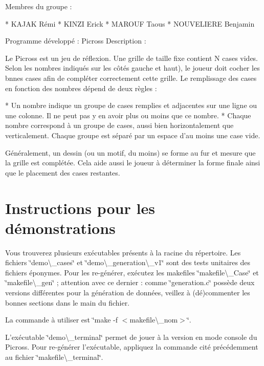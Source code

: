Membres du groupe \+: \begin{DoxyVerb}* KAJAK Rémi
* KINZI Erick
* MAROUF Taous
* NOUVELIERE Benjamin
\end{DoxyVerb}


Programme développé \+: Picross Description \+:

Le Picross est un jeu de réflexion. Une grille de taille fixe contient N cases vides. Selon les nombres indiqués sur les côtés gauche et haut), le joueur doit cocher les bnnes cases afin de compléter correctement cette grille. Le remplissage des cases en fonction des nombres dépend de deux règles \+: \begin{DoxyVerb}* Un nombre indique un groupe de cases remplies et adjacentes sur une ligne ou une colonne. Il ne peut pas y en avoir plus ou moins que ce nombre.
* Chaque nombre correspond à un groupe de cases, aussi bien horizontalement que verticalement. Chaque groupe est séparé par un espace d'au moins une case vide.
\end{DoxyVerb}


Généralement, un dessin (ou un motif, du moins) se forme au fur et mesure que la grille est complétée. Cela aide aussi le joueur à déterminer la forme finale ainsi que le placement des cases restantes.

\section*{Instructions pour les démonstrations}

Vous trouverez plusieurs exécutables présents à la racine du répertoire. Les fichiers \char`\"{}demo\textbackslash{}\+\_\+cases\char`\"{} et \char`\"{}demo\textbackslash{}\+\_\+generation\textbackslash{}\+\_\+v1\char`\"{} sont des tests unitaires des fichiers éponymes. Pour les re-\/générer, exécutez les makefiles \char`\"{}makefile\textbackslash{}\+\_\+\+Case\char`\"{} et \char`\"{}makefile\textbackslash{}\+\_\+gen\char`\"{} ; attention avec ce dernier \+: comme \char`\"{}generation.\+c\char`\"{} possède deux versions différentes pour la génération de données, veillez à (dé)commenter les bonnes sections dans le main du fichier.

La commande à utiliser est \char`\"{}make -\/f $<$makefile\textbackslash{}\+\_\+nom$>$\char`\"{}.

L'exécutable \char`\"{}demo\textbackslash{}\+\_\+terminal\char`\"{} permet de jouer à la version en mode console du Picross. Pour re-\/générer l'exécutable, appliquez la commande cité précédemment au fichier \char`\"{}makefile\textbackslash{}\+\_\+terminal\char`\"{}.

